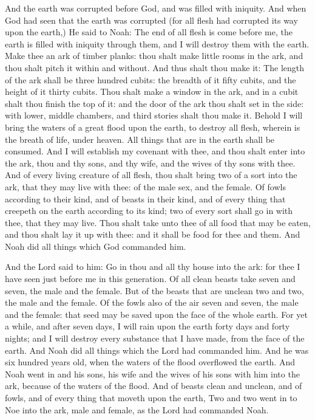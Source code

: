 And the earth was corrupted before God, and was filled with iniquity. And when God had seen that the earth was corrupted (for all flesh had corrupted its way upon the earth,) He said to Noah: The end of all flesh is come before me, the earth is filled with iniquity through them, and I will destroy them with the earth. Make thee an ark of timber planks: thou shalt make little rooms in the ark, and thou shalt pitch it within and without. And thus shalt thou make it: The length of the ark shall be three hundred cubits: the breadth of it fifty cubits, and the height of it thirty cubits. Thou shalt make a window in the ark, and in a cubit shalt thou finish the top of it: and the door of the ark thou shalt set in the side: with lower, middle chambers, and third stories shalt thou make it. Behold I will bring the waters of a great flood upon the earth, to destroy all flesh, wherein is the breath of life, under heaven. All things that are in the earth shall be consumed. And I will establish my covenant with thee, and thou shalt enter into the ark, thou and thy sons, and thy wife, and the wives of thy sons with thee. And of every living creature of all flesh, thou shalt bring two of a sort into the ark, that they may live with thee: of the male sex, and the female. Of fowls according to their kind, and of beasts in their kind, and of every thing that creepeth on the earth according to its kind; two of every sort shall go in with thee, that they may live. Thou shalt take unto thee of all food that may be eaten, and thou shalt lay it up with thee: and it shall be food for thee and them. And Noah did all things which God commanded him.

And the Lord said to him: Go in thou and all thy house into the ark: for thee I have seen just before me in this generation. Of all clean beasts take seven and seven, the male and the female. But of the beasts that are unclean two and two, the male and the female. Of the fowls also of the air seven and seven, the male and the female: that seed may be saved upon the face of the whole earth. For yet a while, and after seven days, I will rain upon the earth forty days and forty nights; and I will destroy every substance that I have made, from the face of the earth. And Noah did all things which the Lord had commanded him. And he was six hundred years old, when the waters of the flood overflowed the earth. And Noah went in and his sons, his wife and the wives of his sons with him into the ark, because of the waters of the flood. And of beasts clean and unclean, and of fowls, and of every thing that moveth upon the earth, Two and two went in to Noe into the ark, male and female, as the Lord had commanded Noah.

